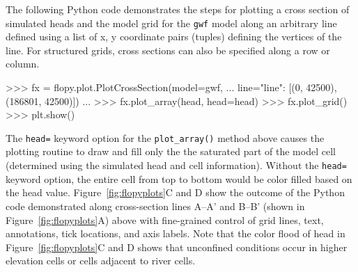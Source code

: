 \documentclass[12pt, oneside]{article}  	%
\begin{document}
The following Python code demonstrates the steps for plotting a cross section of simulated heads and the model grid for the \texttt{gwf} model along an arbitrary line defined using a list of x, y coordinate pairs (tuples) defining the vertices of the line. For structured grids, cross sections can also be specified along a row or column.

\begin{python}
>>> fx = flopy.plot.PlotCrossSection(model=gwf, 
... line={"line": [(0, 42500), (186801, 42500)]})
...
>>> fx.plot_array(head, head=head)
>>> fx.plot_grid()
>>> plt.show()
\end{python}

\noindent The \texttt{head=} keyword option for the \texttt{plot\_array()} method above causes the plotting routine to draw and fill only the the saturated part of the model cell (determined using the simulated head and cell information). Without the \texttt{head=} keyword option, the entire cell from top to bottom would be color filled based on the head value. Figure~\ref{fig:flopyplots}C and D show the outcome of the Python code demonstrated along cross-section lines A--A' and B--B' (shown in Figure~\ref{fig:flopyplots}A) above with fine-grained control of grid lines, text, annotations, tick locations, and axis labels. Note that the color flood of head in Figure~\ref{fig:flopyplots}C and D shows that unconfined conditions occur in higher elevation cells or cells adjacent to river cells.
\end{document}
